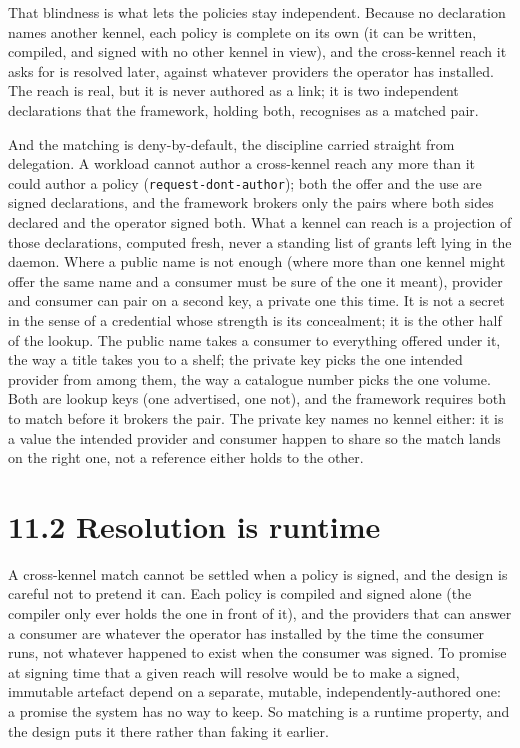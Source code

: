 That blindness is what lets the policies stay independent. Because no
declaration names another kennel, each policy is complete on its own (it
can be written, compiled, and signed with no other kennel in view), and
the cross-kennel reach it asks for is resolved later, against whatever
providers the operator has installed. The reach is real, but it is never
authored as a link; it is two independent declarations that the
framework, holding both, recognises as a matched pair.

And the matching is deny-by-default, the discipline carried straight
from delegation. A workload cannot author a cross-kennel reach any more
than it could author a policy (\texttt{request-dont-author}); both the
offer and the use are signed declarations, and the framework brokers
only the pairs where both sides declared and the operator signed both.
What a kennel can reach is a projection of those declarations, computed
fresh, never a standing list of grants left lying in the daemon. Where a
public name is not enough (where more than one kennel might offer the
same name and a consumer must be sure of the one it meant), provider and
consumer can pair on a second key, a private one this time. It is not a
secret in the sense of a credential whose strength is its concealment;
it is the other half of the lookup. The public name takes a consumer to
everything offered under it, the way a title takes you to a shelf; the
private key picks the one intended provider from among them, the way a
catalogue number picks the one volume. Both are lookup keys (one
advertised, one not), and the framework requires both to match before it
brokers the pair. The private key names no kennel either: it is a value
the intended provider and consumer happen to share so the match lands on
the right one, not a reference either holds to the other.

\hypertarget{resolution-is-runtime}{%
\section{11.2 Resolution is runtime}\label{resolution-is-runtime}}

A cross-kennel match cannot be settled when a policy is signed, and the
design is careful not to pretend it can. Each policy is compiled and
signed alone (the compiler only ever holds the one in front of it), and
the providers that can answer a consumer are whatever the operator has
installed by the time the consumer runs, not whatever happened to exist
when the consumer was signed. To promise at signing time that a given
reach will resolve would be to make a signed, immutable artefact depend
on a separate, mutable, independently-authored one: a promise the system
has no way to keep. So matching is a runtime property, and the design
puts it there rather than faking it earlier.


